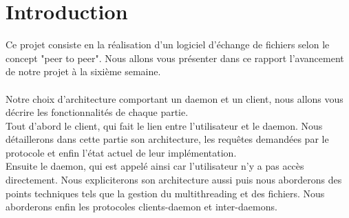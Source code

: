\chapter*{Introduction}
Ce projet consiste en la réalisation d'un logiciel d'échange de fichiers selon
le concept "peer to peer". Nous allons vous présenter dans ce rapport 
l'avancement de notre projet à la sixième semaine.\\
\\
Notre choix d'architecture comportant un daemon et un client, nous allons vous
décrire les fonctionnalités de chaque partie.\\
Tout d'abord le client, qui fait le lien entre l'utilisateur et le daemon. Nous
détaillerons dans cette partie son architecture, les requêtes demandées par le
protocole et enfin l'état actuel de leur implémentation.\\
Ensuite le daemon, qui est appelé ainsi car l'utilisateur n'y a pas accès
directement.
Nous expliciterons son architecture aussi puis nous aborderons des points 
techniques tels que la gestion du multithreading et des fichiers. Nous 
aborderons enfin les protocoles clients-daemon et inter-daemons.
